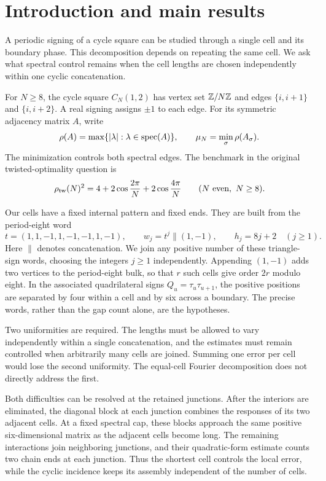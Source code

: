 \section{Introduction and main results}

A periodic signing of a cycle square can be studied through a single cell
and its boundary phase. This decomposition depends on repeating the same
cell. We ask what spectral control remains when the cell lengths are
chosen independently within one cyclic concatenation.

For $N\ge8$, the cycle square $C_N(1,2)$ has vertex set $\mathbb Z/N\mathbb Z$ and
edges $\{i,i+1\}$ and $\{i,i+2\}$. A real signing assigns $\pm1$ to each
edge. For its symmetric adjacency matrix $A$, write
\[
 \rho(A)=\max\{|\lambda|:\lambda\in\operatorname{spec}(A)\},
 \qquad \mu_N=\min_\sigma\rho(A_\sigma).
\]
The minimization controls both spectral edges. The benchmark in the
original twisted-optimality question \cite{Suvagiya2026old} is
\begin{equation}
 \rho_{\mathrm{tw}}(N)^2=4+2\cos\frac{2\pi}{N}+2\cos\frac{4\pi}{N}
 \qquad(N\text{ even},\ N\ge8).
 \label{eq:twisted}
\end{equation}

Our cells have a fixed internal pattern and fixed ends. They are built
from the period-eight word
\begin{equation}
 t=(1,1,-1,1,-1,-1,1,-1),\qquad
 w_j=t^j\mathbin{\|}(1,-1),\qquad h_j=8j+2\quad(j\ge1).
 \label{eq:word}
\end{equation}
Here $\|$ denotes concatenation. We join any positive number of these
triangle-sign words, choosing the integers $j\ge1$ independently.
Appending $(1,-1)$ adds two vertices to the period-eight bulk, so that
$r$ such cells give order $2r$ modulo eight. In the associated
quadrilateral signs $Q_u=\tau_u\tau_{u+1}$, the positive positions are
separated by four within a cell and by six across a boundary. The precise
words, rather than the gap count alone, are the hypotheses.

Two uniformities are required. The lengths must be allowed to vary
independently within a single concatenation, and the estimates must remain
controlled when arbitrarily many cells are joined. Summing one error per
cell would lose the second uniformity. The equal-cell Fourier
decomposition does not directly address the first.

Both difficulties can be resolved at the retained junctions. After the
interiors are eliminated, the diagonal block at each junction combines the
responses of its two adjacent cells. At a fixed spectral cap, these blocks
approach the same positive six-dimensional matrix as the adjacent cells
become long. The remaining interactions join neighboring junctions, and
their quadratic-form estimate counts two chain ends at each junction.
Thus the shortest cell controls the local error, while the cyclic
incidence keeps its assembly independent of the number of cells.

